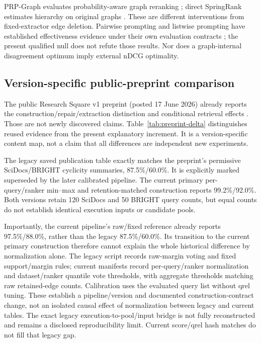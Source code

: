 \documentclass[pdflatex,sn-basic,Numbered]{sn-jnl}
\begin{document}
PRP-Graph evaluates probability-aware graph reranking \cite{luo2024prpgraph}; direct SpringRank estimates hierarchy on original graphs \cite{debacco2018springrank}. These are different interventions from fixed-extractor edge deletion. Pairwise prompting and listwise prompting have established effectiveness evidence under their own evaluation contracts \cite{qin-etal-2024-large,sun-etal-2023-chatgpt}; the present qualified null does not refute those results. Nor does a graph-internal disagreement optimum imply external nDCG optimality.

\subsection{Version-specific public-preprint comparison}
The public Research Square v1 preprint (posted 17 June 2026) already reports the construction/repair/extraction distinction and conditional retrieval effects \cite{vahidi2026retrievalpreprint}. Those are not newly discovered claims. Table~\ref{tab:preprint-delta} distinguishes reused evidence from the present explanatory increment. It is a version-specific content map, not a claim that all differences are independent new experiments.

The legacy saved publication table exactly matches the preprint's permissive SciDocs/BRIGHT cyclicity summaries, 87.5\%/60.0\%. It is explicitly marked superseded by the later calibrated pipeline. The current primary per-query/ranker min--max and retention-matched construction reports 99.2\%/92.0\%. Both versions retain 120 SciDocs and 50 BRIGHT query counts, but equal counts do not establish identical execution inputs or candidate pools.

Importantly, the current pipeline's raw/fixed reference already reports 97.5\%/88.0\%, rather than the legacy 87.5\%/60.0\%. Its transition to the current primary construction therefore cannot explain the whole historical difference by normalization alone. The legacy script records raw-margin voting and fixed support/margin rules; current manifests record per-query/ranker normalization and dataset/ranker quantile vote thresholds, with aggregate thresholds matching raw retained-edge counts. Calibration uses the evaluated query list without qrel tuning. These establish a pipeline/version and documented construction-contract change, not an isolated causal effect of normalization between legacy and current tables. The exact legacy execution-to-pool/input bridge is not fully reconstructed and remains a disclosed reproducibility limit. Current score/qrel hash matches do not fill that legacy gap.
\end{document}
